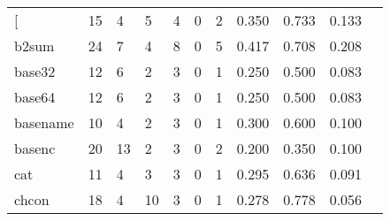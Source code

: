 \begin{longtable}{lp{1.10cm}p{1.10cm}p{1.10cm}p{1.10cm}p{1.10cm}p{1.10cm}p{1.10cm}p{1.10cm}p{1.10cm}p{1.10cm}}
\bottomrule
\endlastfoot
{[}         &                     15 &                                  4 &                                 5 &                                4 &                                 0 &                               2 &                          0.350 &                                 0.733 &                               0.133 \\
b2sum     &                     24 &                                  7 &                                 4 &                                8 &                                 0 &                               5 &                          0.417 &                                 0.708 &                               0.208 \\
base32    &                     12 &                                  6 &                                 2 &                                3 &                                 0 &                               1 &                          0.250 &                                 0.500 &                               0.083 \\
base64    &                     12 &                                  6 &                                 2 &                                3 &                                 0 &                               1 &                          0.250 &                                 0.500 &                               0.083 \\
basename  &                     10 &                                  4 &                                 2 &                                3 &                                 0 &                               1 &                          0.300 &                                 0.600 &                               0.100 \\
basenc    &                     20 &                                 13 &                                 2 &                                3 &                                 0 &                               2 &                          0.200 &                                 0.350 &                               0.100 \\
cat       &                     11 &                                  4 &                                 3 &                                3 &                                 0 &                               1 &                          0.295 &                                 0.636 &                               0.091 \\
chcon     &                     18 &                                  4 &                                10 &                                3 &                                 0 &                               1 &                          0.278 &                                 0.778 &                               0.056 \\

\end{longtable}

